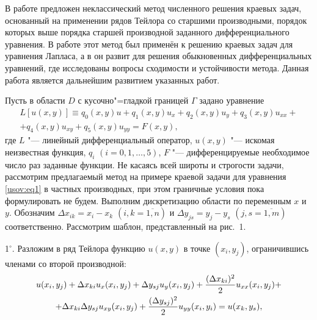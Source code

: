 
\date{02/VI/2012}



\maketitle

\vspace{-2.5mm}

\small

В работе \cite{usov:bib1} предложен неклассический метод
численного решения краевых задач, основанный на применении рядов
Тейлора со старшими производными, порядок которых выше порядка
старшей производной заданного дифференциального уравнения. В
работе \cite{usov:bib2} этот метод был применён к решению краевых
задач для уравнения Лапласа, а в \cite{usov:bib3,usov:bib4} он
развит для решения обыкновенных дифференциальных уравнений, где
исследованы вопросы сходимости и устойчивости метода. Данная
работа является дальнейшим развитием указанных работ.

Пусть в области $D$ с кусочно"=гладкой границей $\Gamma$ задано
уравнение
\begin{multline}
\label{usov:eq1} L[u(x,y)]\equiv q_0(x,y) u + q_1(x,y) u_x + q_2(x,y)u_y
+q_3(x,y)u_{xx}+ \\+q_4(x,y)u_{xy}+q_5(x,y)u_{yy}=F(x,y),
\end{multline}
где $L$ "--- линейный дифференциальный оператор, $u(x,y)$ "---
искомая неизвестная функция, $q_i$ $(i=0, 1,\ldots, 5)$, $F$ "---
дифференцируемые необходимое число раз заданные функции. Не
касаясь всей широты и строгости задачи, рассмотрим предлагаемый
метод на примере краевой задачи для уравнения \eqref{usov:eq1} в
частных производных, при этом граничные условия пока формулировать
не будем. Выполним дискретизацию области по переменным $x$ и $y$.
Обозначим $\Delta x_{ik}=x_i-x_k$ $(i,k=\overline{1, n})$ и
$\Delta y_{js}=y_j-y_s$ $(j,s=\overline{1, m})$ 
соответственно. Рассмотрим шаблон, представленный на рис.~1.

\smallskip

1$^\circ$. Разложим в ряд Тейлора функцию $u(x,y)$ в точке
$(x_i,y_j)$, ограничившись членами со второй производной:
\begin{multline}
\label{usov:eq2} u(x_i,y_j)+\Delta x_{ki} u_x(x_i, y_j)+\Delta
y_{sj}u_y(x_i, y_j)+\frac{(\Delta x_{ki})^2}2u_{xx}(x_i, y_j)+\\
+\Delta x_{ki}\Delta y_{sj}u_{xy}(x_i, y_j)+\frac{(\Delta
y_{sj})^2}2u_{yy} (x_i,y_i)= u(x_k, y_s),
\vspace{-2.5mm}
\end{multline}

